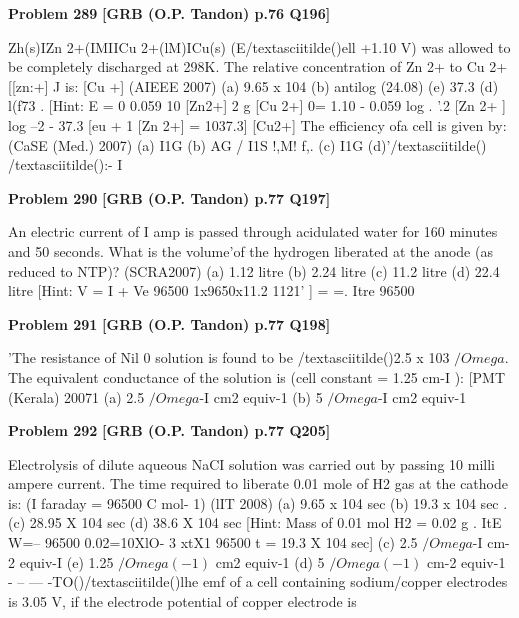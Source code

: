 \begin{problembox}
\textbf{Problem 289} \hfill \textbf{[GRB (O.P. Tandon) p.76 Q196]}
\label{q:ext-grb_all_questions-289}

Zh(s)IZn 2+(IMIICu 2+(lM)ICu(s) (E/textasciitilde()ell 
+1.10 V) 
was allowed to be completely discharged at 298K. The relative 
concentration of Zn 2+ to Cu 2+ [[zn:+] J is: 
[Cu +] 
(AIEEE 2007) 
(a) 9.65 x 104 
(b) antilog (24.08) 
(e) 37.3 
(d) l(f73 
. [Hint: 
E =  0 \underline{\hspace{1cm}} 0.059 10 [Zn2+] 
2 
g [Cu 2+] 
0= 1.10 - 0.059 log 
. 
'.2 
[Zn 2+ ] 
log --2 
-
37.3 
[eu + 1 
[Zn 2+] = 1037.3] 
[Cu2+] 
The efficiency ofa cell is given by: 
(CaSE (Med.) 2007) 
(a) I1G 
(b) AG 
/ 
I1S 
!,M! 
f,. 
(c) I1G 
(d)'/textasciitilde() /textasciitilde():-
I
\end{problembox}

\begin{problembox}
\textbf{Problem 290} \hfill \textbf{[GRB (O.P. Tandon) p.77 Q197]}
\label{q:ext-grb_all_questions-290}

An electric current of I amp is passed through acidulated 
water for 160 minutes and 50 seconds. What is the volume'of 
the hydrogen liberated at the anode (as reduced to NTP)? 
(SCRA2007) 
(a) 1.12 litre 
(b) 2.24 litre (c) 11.2 litre 
(d) 22.4 litre 
[Hint: 
V = I + Ve 
96500 
1x9650x11.2 
1121' 
] 
= 
=. 
Itre 
96500
\end{problembox}

\begin{problembox}
\textbf{Problem 291} \hfill \textbf{[GRB (O.P. Tandon) p.77 Q198]}
\label{q:ext-grb_all_questions-291}

'The resistance of Nil 0 solution is found to be /textasciitilde()2.5 x 103 $/Omega$. 
The equivalent conductance of the solution is (cell constant 
= 1.25 cm-I ): 
[PMT (Kerala) 20071 
(a) 2.5 $/Omega$-I cm2 equiv-1 
(b) 5 $/Omega$-I cm2 equiv-1
\end{problembox}

\begin{problembox}
\textbf{Problem 292} \hfill \textbf{[GRB (O.P. Tandon) p.77 Q205]}
\label{q:ext-grb_all_questions-292}

Electrolysis of dilute aqueous NaCI solution was carried out 
by passing 10 milli ampere current. The time required to 
liberate 0.01 mole of H2 gas at the cathode is: (I faraday = 
96500 C mol- 1) 
(lIT 2008) 
(a) 9.65 x 104 sec 
(b) 19.3 x 104 sec 
. 
(c) 28.95 X 104 sec 
(d) 38.6 X 104 sec 
[Hint: Mass of 0.01 mol H2 = 0.02 g 
. 
ItE 
W=--
96500 
0.02=10XlO-
3 xtX1 
96500 
t = 19.3 X 104 sec] 
(c) 2.5 $/Omega$-I cm-2 equiv-I 
(e) 1.25 $/Omega(-1)$ cm2 equiv-1 
(d) 5 $/Omega(-1)$ cm-2 equiv-1 - -- --- -TO()/textasciitilde()lhe emf of a cell containing sodium/copper electrodes is 
3.05 V, if the electrode potential of copper electrode is
\end{problembox}

